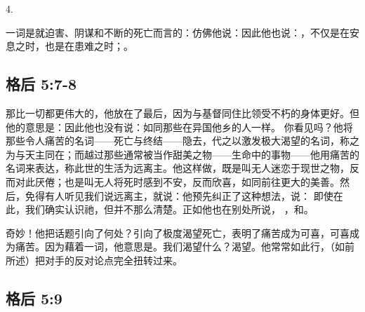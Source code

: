 4. \par

一词是就迫害、阴谋和不断的死亡而言的：仿佛他说：因此他也说：，不仅是在安息之时，也是在患难之时；。\par


\subsection{格后 5:7-8}

\par

那比一切都更伟大的，他放在了最后，因为与基督同住比领受不朽的身体更好。但他的意思是：因此他也没有说：如同那些在异国他乡的人一样。 你看见吗？他将那些令人痛苦的名词——死亡与终结——隐去，代之以激发极大渴望的名词，称之为与天主同在；而越过那些通常被当作甜美之物——生命中的事物——他用痛苦的名词来表达，称此世的生活为远离主。他这样做，既是叫无人迷恋于现世之物，反而对此厌倦；也是叫无人将死时感到不安，反而欣喜，如同前往更大的美善。然后，免得有人听见我们说远离主，就说：他预先纠正了这种想法，说： 即使在此，我们确实认识祂，但并不那么清楚。正如他也在别处所说， ，和。\par

 奇妙！他把话题引向了何处？引向了极度渴望死亡，表明了痛苦成为可喜，可喜成为痛苦。因为藉着一词，他意思是。我们渴望什么？渴望。他常常如此行，（如前所述）把对手的反对论点完全扭转过来。\par


\subsection{格后 5:9}


